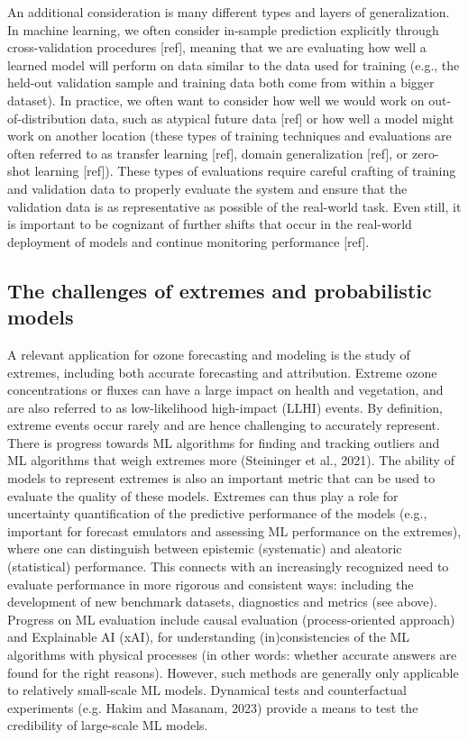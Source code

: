 \documentclass[gmd, manuscript]{copernicus}
\begin{document}
An additional consideration is many different types and layers of generalization. In machine learning, we often consider in-sample prediction explicitly through cross-validation procedures [ref], meaning that we are evaluating how well a learned model will perform on data similar to the data used for training (e.g., the held-out validation sample and training data both come from within a bigger dataset). In practice, we often want to consider how well we would work on out-of-distribution data, such as atypical future data [ref] or how well a model might work on another location (these types of training techniques and evaluations are often referred to as transfer learning [ref], domain generalization [ref], or zero-shot learning [ref]). These types of evaluations require careful crafting of training and validation data to properly evaluate the system and ensure that the validation data is as representative as possible of the real-world task. Even still, it is important to be cognizant of further shifts that occur in the real-world deployment of models and continue monitoring performance [ref].
 

\subsection{The challenges of extremes and probabilistic models}

A relevant application for ozone forecasting and modeling is the study of extremes, including both accurate forecasting and attribution. Extreme ozone concentrations or fluxes can have a large impact on health and vegetation, and are also referred to as low-likelihood high-impact (LLHI) events. By definition, extreme events occur rarely and are hence challenging to accurately represent. There is progress towards ML algorithms for finding and tracking outliers and ML algorithms that weigh extremes more (Steininger et al., 2021). The ability of models to represent extremes is also an important metric that can be used to evaluate the quality of these models. Extremes can thus play a role for uncertainty quantification of the predictive performance of the models (e.g., important for forecast emulators and assessing ML performance on the extremes), where one can distinguish between epistemic (systematic) and aleatoric (statistical) performance. This connects with an increasingly recognized need to evaluate performance in more rigorous and consistent ways: including the development of new benchmark datasets, diagnostics and metrics (see above). Progress on ML evaluation include causal evaluation (process-oriented approach) and Explainable AI (xAI), for understanding (in)consistencies of the ML algorithms with physical processes (in other words: whether accurate answers are found for the right reasons). However, such methods are generally only applicable to relatively small-scale ML models. Dynamical tests and counterfactual experiments (e.g. Hakim and Masanam, 2023) provide a means to test the credibility of large-scale ML models.
\end{document}
